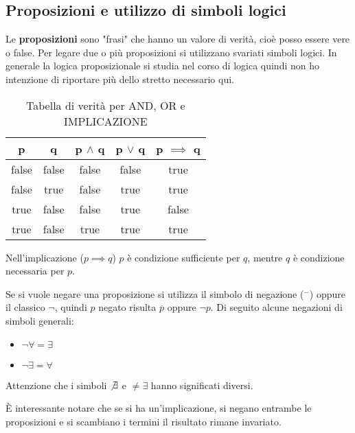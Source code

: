 \subsection{Proposizioni e utilizzo di simboli logici}

Le \textbf{proposizioni} sono "frasi" che hanno un valore di verità, cioè posso essere vere o false. Per legare due o più proposizioni si utilizzano svariati simboli logici. In generale la logica proposizionale si studia nel corso di logica quindi non ho intenzione di riportare più dello stretto necessario qui.

\begin{table}[H]
\centering
\begin{tabular}{|cc|c|c|c|}
\hline
p & q & \multicolumn{1}{l|}{p $\land$ q} & \multicolumn{1}{l|}{p $\lor$ q} & \multicolumn{1}{l|}{p $\implies$ q} \\ \hline
{\color[HTML]{000000} false} & {\color[HTML]{000000} false} & false & false & true \\
{\color[HTML]{000000} false} & {\color[HTML]{000000} true} & false & true & true \\
{\color[HTML]{000000} true} & {\color[HTML]{000000} false} & false & true & false \\
true & false & true & true & true \\ \hline
\end{tabular}

\caption{Tabella di verità per AND, OR e IMPLICAZIONE}
\end{table}

Nell'implicazione ($p \implies q$) $p$ è condizione sufficiente per $q$, mentre $q$ è condizione necessaria per $p$.

Se si vuole negare una proposizione si utilizza il simbolo di negazione ($^-$) oppure il classico $\neg$, quindi $p$ negato risulta $\overline{p}$ oppure $\neg p$. Di seguito alcune negazioni di simboli generali:
\begin{itemize}
    \item $\neg \forall = \exists$
    \item $\neg \exists = \forall$
\end{itemize}
Attenzione che i simboli $\not \exists$ e $\neq \exists$ hanno significati diversi. 

È interessante notare che se si ha un'implicazione, si negano entrambe le proposizioni e si scambiano i termini il risultato rimane invariato.

